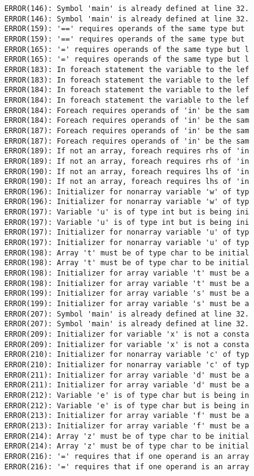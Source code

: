 \documentclass[12pt]{book}
\begin{document}
\begin{lstlisting}
ERROR(146): Symbol 'main' is already defined at line 32.	ERROR(146): Symbol 'main' is already defined at line 32.
ERROR(159): '==' requires operands of the same type but 	ERROR(159): '==' requires operands of the same type but 
ERROR(165): '=' requires operands of the same type but l	ERROR(165): '=' requires operands of the same type but l
ERROR(183): In foreach statement the variable to the lef	ERROR(183): In foreach statement the variable to the lef
ERROR(184): In foreach statement the variable to the lef	ERROR(184): In foreach statement the variable to the lef
ERROR(184): Foreach requires operands of 'in' be the sam	ERROR(184): Foreach requires operands of 'in' be the sam
ERROR(187): Foreach requires operands of 'in' be the sam	ERROR(187): Foreach requires operands of 'in' be the sam
ERROR(189): If not an array, foreach requires rhs of 'in	ERROR(189): If not an array, foreach requires rhs of 'in
ERROR(190): If not an array, foreach requires lhs of 'in	ERROR(190): If not an array, foreach requires lhs of 'in
ERROR(196): Initializer for nonarray variable 'w' of typ	ERROR(196): Initializer for nonarray variable 'w' of typ
ERROR(197): Variable 'u' is of type int but is being ini	ERROR(197): Variable 'u' is of type int but is being ini
ERROR(197): Initializer for nonarray variable 'u' of typ	ERROR(197): Initializer for nonarray variable 'u' of typ
ERROR(198): Array 't' must be of type char to be initial	ERROR(198): Array 't' must be of type char to be initial
ERROR(198): Initializer for array variable 't' must be a	ERROR(198): Initializer for array variable 't' must be a
ERROR(199): Initializer for array variable 's' must be a	ERROR(199): Initializer for array variable 's' must be a
ERROR(207): Symbol 'main' is already defined at line 32.	ERROR(207): Symbol 'main' is already defined at line 32.
ERROR(209): Initializer for variable 'x' is not a consta	ERROR(209): Initializer for variable 'x' is not a consta
ERROR(210): Initializer for nonarray variable 'c' of typ	ERROR(210): Initializer for nonarray variable 'c' of typ
ERROR(211): Initializer for array variable 'd' must be a	ERROR(211): Initializer for array variable 'd' must be a
ERROR(212): Variable 'e' is of type char but is being in	ERROR(212): Variable 'e' is of type char but is being in
ERROR(213): Initializer for array variable 'f' must be a	ERROR(213): Initializer for array variable 'f' must be a
ERROR(214): Array 'z' must be of type char to be initial	ERROR(214): Array 'z' must be of type char to be initial
ERROR(216): '=' requires that if one operand is an array	ERROR(216): '=' requires that if one operand is an array

\end{lstlisting}
\end{document}
